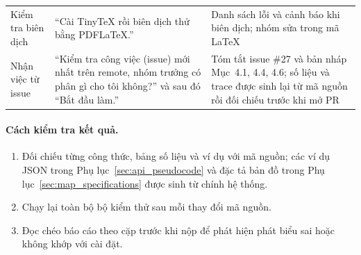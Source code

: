 \begin{table}[htbp]
\begin{tabularx}{\textwidth}{>{\raggedright\arraybackslash}p{2.3cm}%
      >{\raggedright\arraybackslash}X>{\raggedright\arraybackslash}p{4cm}}
    \addlinespace
    Kiểm tra biên dịch
      & ``Cài TinyTeX rồi biên dịch thử bằng PDFLaTeX.''
      & Danh sách lỗi và cảnh báo khi biên dịch; nhóm sửa trong mã LaTeX \\
    \addlinespace
    Nhận việc từ issue
      & ``Kiểm tra công việc (issue) mới nhất trên remote, nhóm trưởng có phân
        gì cho tôi không?'' và sau đó ``Bắt đầu làm.''
      & Tóm tắt issue \#27 và bản nháp Mục~4.1, 4.4, 4.6; số liệu và trace
        được sinh lại từ mã nguồn rồi đối chiếu trước khi mở PR \\
    \bottomrule
  \end{tabularx}
\end{table}

\paragraph{Cách kiểm tra kết quả.}
\begin{enumerate}
  \item Đối chiếu từng công thức, bảng số liệu và ví dụ với mã nguồn; các ví
    dụ JSON trong Phụ lục~\ref{sec:api_pseudocode} và đặc tả bản đồ trong
    Phụ lục~\ref{sec:map_specifications} được sinh từ chính hệ thống.
  \item Chạy lại toàn bộ bộ kiểm thử sau mỗi thay đổi mã nguồn.
  \item Đọc chéo báo cáo theo cặp trước khi nộp để phát hiện phát biểu sai
    hoặc không khớp với cài đặt.
\end{enumerate}
